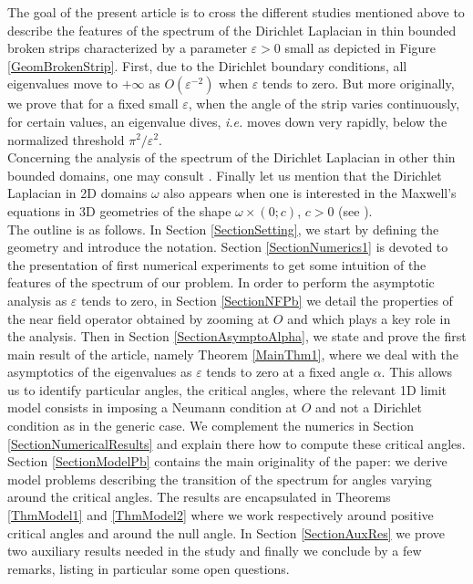 \documentclass[11pt,a4paper]{article}
\newcommand{\eps}{\varepsilon}
\newcommand{\om}{\omega}
\begin{document}
\newline
The goal of the present article is to cross the different studies mentioned above to describe the features of the spectrum of the Dirichlet Laplacian in thin bounded broken strips characterized by a parameter $\eps>0$ small as depicted in Figure \ref{GeomBrokenStrip}. First, due to the Dirichlet boundary conditions, all eigenvalues move to $+\infty$ as $O(\eps^{-2})$ when $\eps$ tends to zero. But more originally, we prove that for a fixed small $\eps$, when the angle of the strip varies continuously, for certain values, an eigenvalue dives, \textit{i.e.} moves down very rapidly, below the normalized threshold $\pi^2/\eps^2$. \\
\newline
Concerning the analysis of the spectrum of the Dirichlet Laplacian in other thin bounded domains, one may consult \cite{KaNa00,Frei07,FrSo09,BoFr09}. Finally let us mention that the Dirichlet Laplacian in 2D domains $\om$ also appears when one is interested in the Maxwell's equations in 3D geometries of the shape $\om\times(0;c)$, $c>0$ (see \cite{GoJa92,CLMM93,BoCF25}).\\
\newline
The outline is as follows. In Section \ref{SectionSetting}, we start by defining the geometry and introduce the notation. Section \ref{SectionNumerics1} is devoted to the presentation of first numerical experiments to get some intuition of the features of the spectrum of our problem. In order to perform the asymptotic analysis as $\eps$ tends to zero, in Section \ref{SectionNFPb} we detail the properties of the near field operator obtained by zooming at $O$ and which plays a key role in the analysis. Then in Section \ref{SectionAsymptoAlpha}, we state and prove the first main result of the article, namely Theorem \ref{MainThm1}, where we deal with the asymptotics of the eigenvalues as $\eps$ tends to zero at a fixed angle $\alpha$. This allows us to identify particular angles, the critical angles, where the relevant 1D limit model consists in imposing a Neumann condition at $O$ and not a Dirichlet condition as in the generic case. We complement the numerics in Section \ref{SectionNumericalResults} and explain there how to compute these critical angles. Section \ref{SectionModelPb} contains the main originality of the paper: we derive model problems describing the transition of the spectrum for angles varying around the critical angles. The results are encapsulated in Theorems \ref{ThmModel1} and \ref{ThmModel2} where we work respectively around positive critical angles and around the null angle. In Section \ref{SectionAuxRes} we prove two auxiliary results needed in the study and finally we conclude by a few remarks, listing in particular some open questions. 
\end{document}
